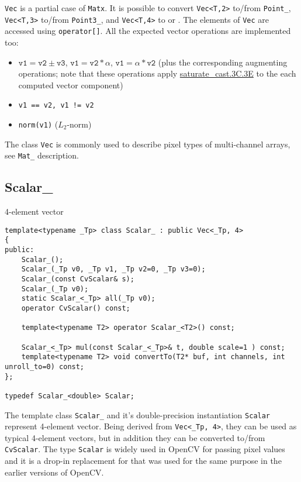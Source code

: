 \texttt{Vec} is a partial case of \texttt{Matx}. It is possible to convert \texttt{Vec<T,2>} to/from \texttt{Point\_}, \texttt{Vec<T,3>} to/from \texttt{Point3\_}, and \texttt{Vec<T,4>} to  or . The elements of \texttt{Vec} are accessed using \texttt{operator[]}. All the expected vector operations are implemented too:

\begin{itemize}
    \item $\texttt{v1} = \texttt{v2} \pm \texttt{v3}$, $\texttt{v1} = \texttt{v2} * \alpha$, $\texttt{v1} = \alpha * \texttt{v2}$ (plus the corresponding augmenting operations; note that these operations apply \hyperref[saturatecast]{saturate\_cast.3C.3E} to the each computed vector component)
    \item \texttt{v1 == v2, v1 != v2}
    \item \texttt{norm(v1)} ($L_2$-norm)
\end{itemize}

The class \texttt{Vec} is commonly used to describe pixel types of multi-channel arrays, see \texttt{Mat\_} description.

\subsection{Scalar\_}
4-element vector

\begin{lstlisting}
template<typename _Tp> class Scalar_ : public Vec<_Tp, 4>
{
public:
    Scalar_();
    Scalar_(_Tp v0, _Tp v1, _Tp v2=0, _Tp v3=0);
    Scalar_(const CvScalar& s);
    Scalar_(_Tp v0);
    static Scalar_<_Tp> all(_Tp v0);
    operator CvScalar() const;

    template<typename T2> operator Scalar_<T2>() const;

    Scalar_<_Tp> mul(const Scalar_<_Tp>& t, double scale=1 ) const;
    template<typename T2> void convertTo(T2* buf, int channels, int unroll_to=0) const;
};

typedef Scalar_<double> Scalar;
\end{lstlisting}

The template class \texttt{Scalar\_} and it's double-precision instantiation \texttt{Scalar} represent 4-element vector. Being derived from \texttt{Vec<\_Tp, 4>}, they can be used as typical 4-element vectors, but in addition they can be converted to/from \texttt{CvScalar}. The type \texttt{Scalar} is widely used in OpenCV for passing pixel values and it is a drop-in replacement for  that was used for the same purpose in the earlier versions of OpenCV.

